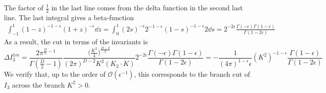 The factor of $\frac{1}{2}$ in the last line comes from the delta function in the second last line.
%
The last integral gives a beta-function
%
\begin{equation*}
\begin{split}
\int^1_{-1} (1-z)^{-1-\epsilon}(1+z)^{-\epsilon} \dd z 
=\int^1_0(2s)^{-\epsilon} 2^{-1-\epsilon} (1-s)^{-1-\epsilon} 2 \dd s
=2^{-2\epsilon}\frac{\Gamma(-\epsilon)\Gamma(1-\epsilon)}{\Gamma(1-2\epsilon)}
\end{split}
\end{equation*}
%
As a result, the cut in terms of the invariants is
\begin{equation*}
\Delta I_3^{1m} = 
\frac{2\pi^{\frac{D}{2}-1}}{\Gamma(\frac{D}{2}-1)}\frac{\big(\frac{K^2}{4}\big)^{\frac{D-2}{2}}}{(2\pi)^{D-2}K^2(K_2\cdot K)} 2^{-2\epsilon}\frac{\Gamma(-\epsilon)\Gamma(1-\epsilon)}{\Gamma(1-2\epsilon)}
=
-\frac{1}{(4\pi)^{1 - \epsilon}\epsilon}(K^{2})^{-1-\epsilon}\frac{\Gamma(1-\epsilon)}{\Gamma(1-2\epsilon)}
\end{equation*}
We verify that, up to the order of $\mathcal{O}(\epsilon^{-1})$, this corresponds to the branch cut of $I_3$ across the branch $K^2 > 0$.